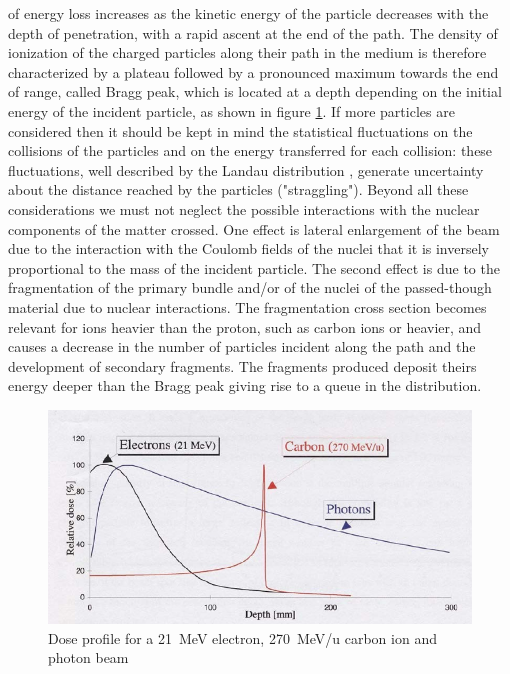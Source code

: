 of energy loss increases as the kinetic energy of the particle decreases with the depth of penetration, with a rapid ascent at the end of the path. The density of ionization of the charged particles along their path in the medium is therefore
characterized by a plateau followed by a pronounced maximum towards the end of range, called Bragg peak, which is located at a depth depending on the initial energy of the incident particle, as shown in figure \ref{fig:braggpeak}.
\newline
If more particles are considered then it should be kept in mind
the statistical fluctuations on the collisions of the particles and on the energy transferred for each collision: these fluctuations, well described by the Landau distribution \cite{landau}, generate uncertainty about the distance reached by the particles ("straggling"). Beyond all these considerations we must not neglect the possible interactions with the nuclear components of the matter crossed. One effect is lateral enlargement of the beam due to the interaction with the Coulomb fields of the nuclei that it is inversely proportional to the mass of the incident particle. The second effect is due to the fragmentation of the primary bundle and/or of the nuclei of the passed-though material due to nuclear interactions. The fragmentation cross section becomes relevant for ions heavier than the proton, such as carbon ions or heavier, and causes a decrease in the number of particles incident along the path
and the development of secondary fragments. The fragments produced deposit theirs energy deeper than the Bragg peak giving rise to a queue in the distribution.
\begin{figure}[H]
	\centering
	\includegraphics[width=0.7\linewidth]{IMG/ch1/BraggPeak}
	\caption{Dose profile for a 21~MeV electron, 270~MeV/u carbon ion and photon beam}
	\label{fig:braggpeak}
\end{figure}  



